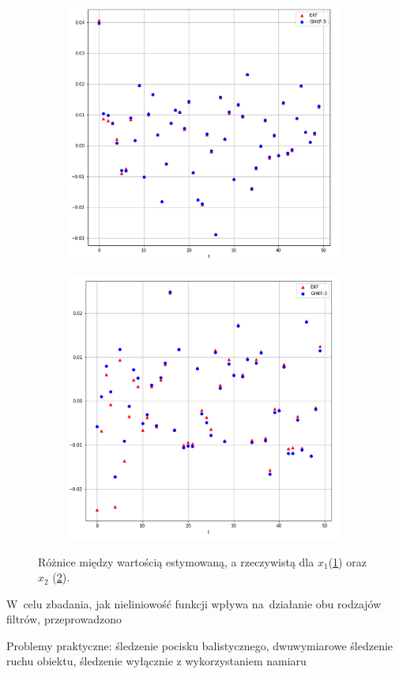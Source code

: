 \begin{figure}
	\centering
	\begin{subfigure}[b]{0.4\linewidth}
		\includegraphics[width=\linewidth]{Liu1_x1_error.png}
		\caption{}
		\label{fig:Liu1_errors_a}
	\end{subfigure}
	\begin{subfigure}[b]{0.4\linewidth}
		\includegraphics[width=\linewidth]{Liu1_x2_error.png}
		\caption{}
		\label{fig:Liu1_errors_b}
	\end{subfigure}
	\caption{Różnice między wartością estymowaną, a rzeczywistą dla $x_1$(\ref{fig:Liu1_errors_a}) oraz $x_2$ (\ref{fig:Liu1_errors_b}).}
	\label{fig:Liu1_errors}
\end{figure}


\par


W~celu zbadania, jak nieliniowość funkcji wpływa na~działanie obu rodzajów filtrów, przeprowadzono 

Problemy praktyczne:  śledzenie pocisku balistycznego, dwuwymiarowe śledzenie ruchu obiektu, śledzenie wyłącznie z wykorzystaniem namiaru 